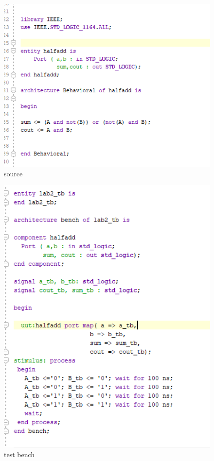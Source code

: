 \documentclass{article}
\begin{document}
\begin{figure}[h]
\begin{center}
\includegraphics[width=1\textwidth]{halfaddSource.png} %
\caption{source}
\end{center}
\end{figure}

\begin{figure}[h]
\begin{center}
\includegraphics[width=1\textwidth]{halfAddTest.png} %
\caption{test bench}
\end{center}
\end{figure}
\end{document}
